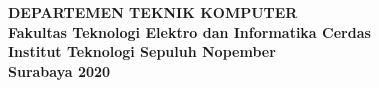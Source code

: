 \begin{flushleft}
  \noindent\textbf{DEPARTEMEN TEKNIK KOMPUTER} \\
  \textbf{Fakultas Teknologi Elektro dan Informatika Cerdas} \\
  \textbf{Institut Teknologi Sepuluh Nopember} \\
  \textbf{Surabaya 2020}

\end{flushleft}

\restoregeometry